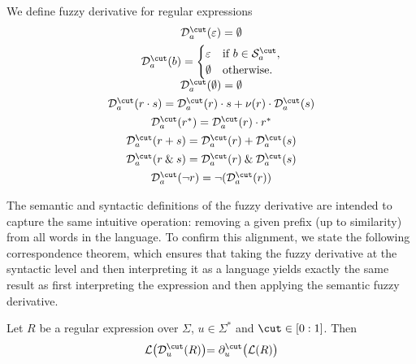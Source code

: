 \noindent We define fuzzy derivative for regular expressions
$$
\begin{array}{c}
    \mathcal{D}^\cut_a(\varepsilon)=\emptyset \\[1ex]
 \mathcal{D}^\cut_a(b)=
      \begin{cases}
        \varepsilon & \text{if } b \in \mathcal{S}^\cut_a,\\
        \emptyset       & \text{otherwise.}
      \end{cases}\\[1ex]
    \mathcal{D}^\cut_a(\emptyset)=\emptyset \\[1ex]
    \mathcal{D}^\cut_a(r\cdot s)= \mathcal{D}^\cut_a(r)\cdot s + \nu(r)\cdot \mathcal{D}^\cut_a(s) \\[1ex]
    \mathcal{D}^\cut_a(r^*)=\mathcal{D}^\cut_a(r)\cdot r^* \\[1ex]
    \mathcal{D}^\cut_a(r+s)=\mathcal{D}^\cut_a(r)+\mathcal{D}^\cut_a(s) \\[1ex]
    \mathcal{D}^\cut_a(r\:\&\:s)=\mathcal{D}^\cut_a(r)\:\&\:\mathcal{D}^\cut_a(s) \\[1ex]
    \mathcal{D}^\cut_a(\neg r) = \neg(\mathcal{D}^\cut_a(r))
\end{array}
$$

\noindent
The semantic and syntactic definitions of the fuzzy derivative are intended to capture the same intuitive operation: removing a given prefix (up to similarity) from all words in the language. To confirm this alignment, we state the following correspondence theorem, which ensures that taking the fuzzy derivative at the syntactic level and then interpreting it as a language yields exactly the same result as first interpreting the expression and then applying the semantic fuzzy derivative.


\begin{theorem}\label{the:two-fuzzy-derivative-mapping}
    Let $R$ be a regular expression over $\Sigma$, $u\in\Sigma^*$ and $\cut\in[0:1]$. Then
    $$
        \mathcal{L}\bigr(\mathcal{D}^\cut_u(R)\bigl)=\partial^\cut_u\bigr(\mathcal{L}(R)\bigl)
    $$
\end{theorem}

